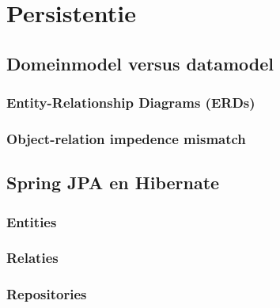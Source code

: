 \chapter{Persistentie}

\section{Domeinmodel versus datamodel}
\subsection{Entity-Relationship Diagrams (ERDs)}
\subsection{Object-relation impedence mismatch}

\section{Spring JPA en Hibernate}
\subsection{Entities}
\subsection{Relaties}
\subsection{Repositories}